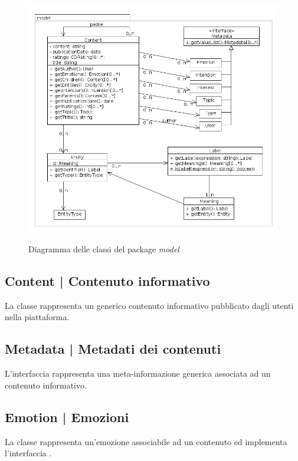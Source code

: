 \documentclass[10pt,a4paper,headinclude,footinclude,hidelinks]{scrreprt} %
\begin{document}
	\begin{figure}[ht]
		\begin{center}
	    	\includegraphics[width=12cm]{class/model.png}
			\label{gfx:class:model}
			\caption{Diagramma delle classi del package \textit{model}}
		\end{center}
	\end{figure}

	\subsection[Content]{Content | Contenuto informativo}
	\label{sec:stage:design:model:content}
	La classe \textit{} rappresenta un generico contenuto informativo pubblicato dagli utenti nella piattaforma.

	\subsection[Metadata]{Metadata | Metadati dei contenuti}
	\label{sec:stage:design:model:metadata}
	L'interfaccia \textit{} rappresenta una meta-informazione generica associata ad un contenuto informativo.

	\subsection[Emotion]{Emotion | Emozioni}
	\label{sec:stage:design:model:metadata-emotion}
	La classe \textit{} rappresenta un'emozione associabile ad un contenuto ed implementa l'interfaccia \textit{}.
\end{document}
